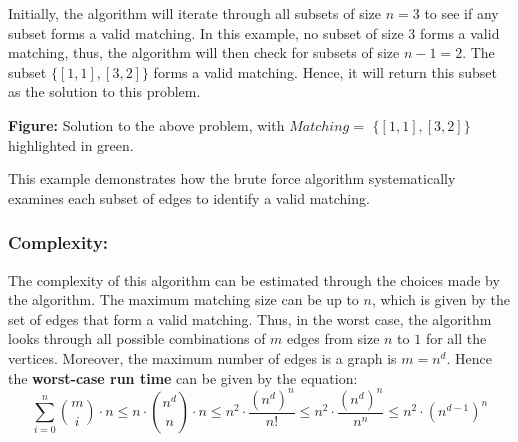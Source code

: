 Initially, the algorithm will iterate through all subsets of size $n=3$ to see if any subset forms a valid matching. In this example, no subset of size 3 forms a valid matching, thus, the algorithm will then check for subsets of size $n-1 = 2$. The subset $\{[1, 1], [3, 2]\}$ forms a valid matching. Hence, it will return this subset as the solution to this problem.


\begin{center}

\end{center}
\begin{center}
    \textbf{Figure:} Solution to the above problem, with $Matching =$ \(\{[1, 1], [3, 2]\}\) highlighted in green.
\end{center}


This example demonstrates how the brute force algorithm systematically examines each subset of edges to identify a valid matching.

\subsubsection*{Complexity:}
The complexity of this algorithm can be estimated through the choices made by the algorithm. The maximum matching size can be up to $n$, which is given by the set of edges that form a valid matching. Thus, in the worst case, the algorithm looks through all possible combinations of $m$ edges from size $n$ to $1$ for all the vertices. Moreover, the maximum number of edges is a graph is $m=n^d$. Hence the \textbf{worst-case run time} can be given by the equation:
\[
\sum_{i=0}^{n} \binom{m}{i} \cdot n \leq n \cdot \binom{n^d}{n}  \cdot n \leq n^2 \cdot \frac{(n^d)^n}{n!} \leq n^2 \cdot \frac{(n^d)^n}{n^n} \leq n^2 \cdot (n^{d-1})^n
\]

